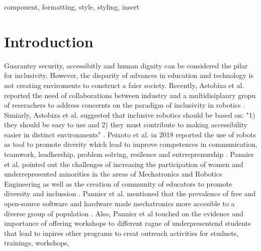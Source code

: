 \documentclass[conference]{IEEEtran}
\begin{document}
\maketitle

\begin{abstract}
This document is a model and instructions for \LaTeX.
This and the IEEEtran.cls file define the components of your paper [title, text, heads, etc.]. 
*CRITICAL: Do Not Use Symbols, Special Characters, Footnotes, or Math in Paper Title or Abstract.
\lipsum[2]
\end{abstract}

\begin{IEEEkeywords}
component, formatting, style, styling, insert
\end{IEEEkeywords}

\section{Introduction}
Guarantey security, accessibitly and human dignity can be considered the pilar for inclusivity.
However, the disparity of advances in education and technology is not creating enviroments to construct a faier society.
Recently, Astobiza et al. reported the need of collaborations between industry and a multidisiplanry gropu of reserachers to address concernts on the paradigm of inclusivity in robotics \cite{MonasterioAstobiza2019}.
Simiarly, Astobiza et al. suggested that inclusive robotics should be based on: "1) they should be easy to use and 2) they must contribute to making accessibility easier in distinct environments" \cite{MonasterioAstobiza2019}.
Peixoto et al. in 2018 reported the use of robots as tool to promote diverity which lead to improve competences in communication, teamwork, leadhership, problem solving, resilence and entrreprenurship \cite{PeixotoCastro2018, PeixotoGonzalez2018}. 
Pannier et al. pointed out the challenges of increasing the  participation of women and underrepresented minorities in the areas of Mechatronics and Robotics Engineering as well as the creation of community of educators to promote diversity and inclussion \cite{Pannier2020}.
Pannier et al. mentioned that the prevalence of free and open-source software and hardware made mechatronics more accesible to a diverse group of population \cite{Pannier2020}.
Also, Pannier et al touched on the evidence and importance of offering workshops to different ragne of underpresentend students that lead to inpires other programs to creat outreach activities for studnets, trainings, workshops, 
\end{document}
